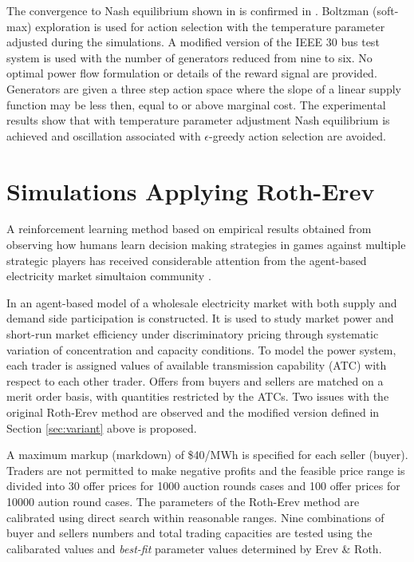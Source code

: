 The convergence to Nash equilibrium shown in \cite{krause:nash04} is confirmed
in \cite{sistani:06}.  Boltzman (soft-max) exploration is used for action
selection with the temperature parameter adjusted during the simulations.  A
modified version of the IEEE 30 bus test system is used with the number of
generators reduced from nine to six.  No optimal power flow formulation or
details of the reward signal are provided.  Generators are given a three step
action space where the slope of a linear supply function may be less then, equal
to or above marginal cost.  The experimental results show that with temperature
parameter adjustment Nash equilibrium is achieved and oscillation associated
with $\epsilon$-greedy action selection are avoided.


\section{Simulations Applying Roth-Erev}
A reinforcement learning method based on empirical results obtained from
observing how humans learn decision making strategies in games against multiple
strategic players has received considerable attention from the agent-based
electricity market simultaion community \cite{roth:games,roth:aer}.

In \cite{nicolaisen:2001} an agent-based model of a wholesale electricity market
with both supply and demand side participation is constructed.  It is used to
study market power and short-run market efficiency under discriminatory pricing
through systematic variation of concentration and capacity conditions.  To model
the power system, each trader is assigned values of available transmission
capability (ATC) with respect to each other trader.  Offers from buyers and
sellers are matched on a merit order basis, with quantities restricted by
the ATCs.  Two issues with the original Roth-Erev method are observed and the
modified version defined in Section \ref{sec:variant} above is proposed.

A maximum markup (markdown) of \$40/MWh is specified for each seller (buyer).
Traders are not permitted to make negative profits and the feasible price range
is divided into 30 offer prices for 1000 auction rounds cases and 100 offer
prices for 10000 aution round cases.  The parameters of the Roth-Erev method are
calibrated using direct search within reasonable ranges.  Nine combinations of
buyer and sellers numbers and total trading capacities are tested using the
calibarated values and \textit{best-fit} parameter values determined by Erev \&
Roth.

